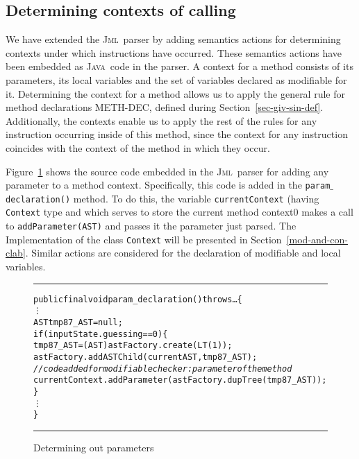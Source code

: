 \documentclass[a4paper]{llncs}
\newcommand{\jml}{\textsc{Jml}}
\newcommand{\java}{\textsc{Java}}
\begin{document}
\subsection{Determining contexts of calling}
\label{fig-out-met-cal-con}
We have extended the \jml~parser by adding semantics actions for
determining contexts under which instructions have occurred. These
semantics actions have been embedded as \java~code in the parser. A
context for a method consists of its parameters, its local variables
and the set of variables declared as modifiable for it. Determining
the context for a method allows us to apply the general rule for method
declarations \textup{METH-DEC}, defined during
Section~\ref{sec-giv-sin-def}. Additionally, the contexts enable us to
apply the rest of the rules
for any instruction occurring inside of this method, since the context
for any instruction coincides with the context of the method in which
they occur.

Figure~\ref{fig-out-par} shows the source code embedded in the
\jml~parser for adding any parameter to a method
context. Specifically, this code is added in the
\texttt{param$\_$declaration()} method. To do this, the variable
\texttt{currentContext} (having \texttt{Context} type and which serves
to store the current method context0 makes a call to
\texttt{addParameter(AST)} and passes it the parameter just
parsed. The Implementation of the class \texttt{Context} will be
presented in
Section~\ref{mod-and-con-clab}. Similar actions are
considered for the declaration of modifiable and local variables.
\begin{figure}[tbh]
\rule{\linewidth}{0.25mm}
\begin{alltt}
   public final void param_declaration() throws \dots \verb!{! 
      \vdots
      AST tmp87_AST = null;
      if(inputState.guessing == 0) \verb!{!
         tmp87_AST = (AST)astFactory.create(LT(1));
         astFactory.addASTChild(currentAST, tmp87_AST);
         {\it//code added for modifiable checker: parameter of the method}
         currentContext.addParameter(astFactory.dupTree(tmp87_AST));
      \verb!}!
      \vdots
   \verb!}!
\end{alltt}
\caption{Determining out parameters}
\label{fig-out-par}
\rule{\linewidth}{0.25mm}
\end{figure}
\end{document}
